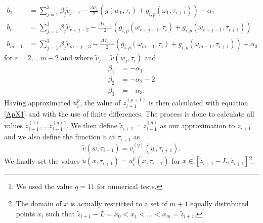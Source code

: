 \documentclass[00main.tex]{subfiles}
\begin{document}
\begin{align*}
b_1  &= \sum_{j=1}^3\beta_j\tilde{v}_{j-1}- \frac{\Delta \tau_1}{2}(g(w_1,\tau_i)+g_{i,p}(\omega_1,\tau_{i+1})) -\alpha_1\\
b_r  &= \sum_{j=1}^3\beta_j\tilde{v}_{r+j-2}- \frac{\Delta \tau_{i+1}}{2}(g_{i,p}(\omega_{r+j-1},\tau_i)+g_{i,p}(\omega_{r+j-1},\tau_{i+1}))\\
b_{m-1}  &= \sum_{j=1}^3\beta_j\tilde{v}_{m+j-3}- \frac{\Delta \tau_{i+1}}{2}(g_{i,p}(\omega_{m-1},\tau_i)+g_{i,p}(\omega_{m-1},\tau_{i+1}))-\alpha_3
\end{align*} for $ r = 2,\hdots m-2$ and where $\tilde{v}_j = \tilde{v}(w_j,\tau_i)$ and \begin{align*}
\beta_1 &=-\alpha_1 \\ 
\beta_2 &=-\alpha_2-2 \\ 
\beta_3 &=-\alpha_3 .
\end{align*} Having approximated $u_i^{p}$, the value of $z_{i+1}^{(p+1)}$ is then calculated with equation \eqref{ApX1} and with the use of finite differences. The process is done to  calculate all values $z_{i+1}^{(1)},\hdots z_{i+1}^{(q)}$\footnote{We used the value $q=11$ for numerical tests.}. We then define $\tilde{z}_{i+1} = z_{i+1}^{(q)}$ as our approximation to $z_{i+1}$ and we also define the function $\tilde{v}$ at $\tau_{i+1}$ as \[ \tilde{v}(w,\tau_{i+1})=v_i^{(q)}(w,\tau_{i+1}).\] We finally set the values $\tilde{u}(x,\tau_{i+1})=u_i^p(x,\tau_{i+1})$ for $x\in[\tilde{z}_{i+1}-L,\tilde{z}_{i+1}]$\footnote{The domain of $x$ is actually restricted to a set of $m+1$ equally distributed points $x_i$ such that $\tilde{z}_{i+1}-L=x_0<x_1<\hdots <x_m= \tilde{z}_{i+1}$.}. 
\end{document}
